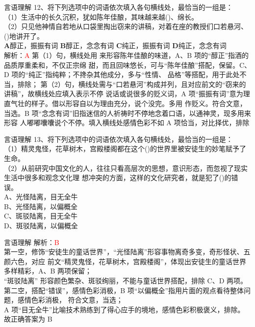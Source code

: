 \documentclass[aspectratio=169]{beamer}
\begin{document}
\begin{frame}[t]{言语理解}
    12、将下列选项中的词语依次填入各句横线处，最恰当的一组是：\\
    （1）生活中的长久沉积，犹如陈年佳酿，其味越来越()、绵长。\\
   （2）只见他神情自若地从口袋里掏出窃来的讲稿，对着在座的教授们口若悬河、()地讲开了。\\
\textbf{A}醇正，振振有词
\textbf{B}醇正，念念有词
\textbf{C}纯正，振振有词
\textbf{D}纯正，念念有词\\
 解析：\textcolor{red}{A}
    第（1）句，横线处用  来形容陈年佳酿的味道，A、B 项的“醇正”指酒的品质厚重柔和，不仅正宗绵
甜，而且回味悠长，可与“陈年佳酿”搭配，保留。C、D 项的“纯正”指纯粹；不搀杂其他成分，多与“性情、
品格”等搭配，用于此处不当，排除；
第（2）句，横线处需与“口若悬河”构成并列，且对应前文的“窃来的讲稿”，故横线处应填入表示不停
说话或说很多的贬义词，A 项“振振有词”意为理直气壮的样子。借以形容自以为理由充分，说个没完。多用
作贬义。符合文意，当选。B 项“念念有词”旧指迷信的人祈祷时不停地念着口语，以通神灵，现多用来形容
人嘟嘟囔囔说个不停。填入横线处感情色彩不如 A 项恰当，对比择优，排除
\end{frame}



\begin{frame}[t]{言语理解}
    13、将下列选项中的词语依次填入各句横线处，最恰当的一组是：\\
    （1）精灵鬼怪，花草树木，宫殿楼阁都在这个()的世界里被安徒生的妙笔赋予了生命。\\
    （2）从前研究中国文化的人，往往只看高层次的思想，意识形态，而忽视了现实生活中很多和观念文化理
    想冲突的方面，这样的文化研究者，就是犯了()的错误。\\
    A、光怪陆离，目无全牛\\
    B、光怪陆离，以偏概全\\
    C、斑驳陆离，目无全牛\\
    D、斑驳陆离，以偏概全\\
\end{frame}



\begin{frame}[t]{言语理解}
 解析：\textcolor{red}{B}\\
    第一空，修饰“安徒生的童话世界”，“光怪陆离”形容事物离奇多变，奇形怪状、五颜六色，对应
前文“精灵鬼怪，花草树木，宫殿楼阁”，体现出安徒生的童话世界多样精彩，A、B 两项保留；\\
    “斑驳陆离”
形容颜色繁杂、斑驳绚丽，不能与童话世界搭配，排除 C、D 两项。\\

第二空，搭配“错误”，感情色彩消极，B 项“以偏概全”指用片面的观点看待整体问题，感情色彩消极，
符合文意，当选；\\
    A 项“目无全牛”比喻技术熟练到了得心应手的境地，感情色彩积极褒义，排除。
故正确答案为 B
\end{frame}
\end{document}
